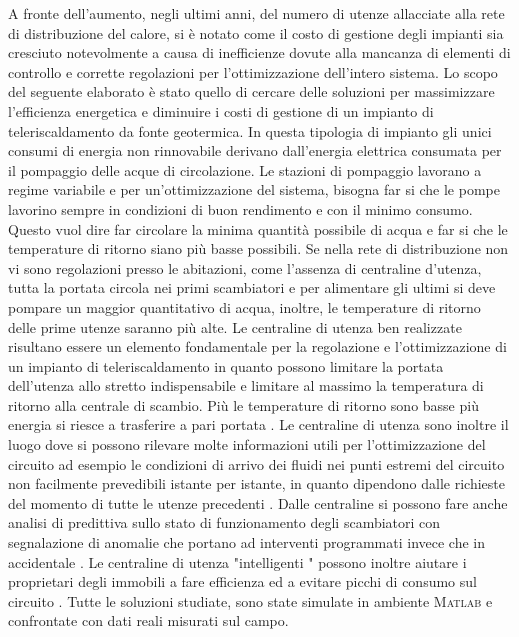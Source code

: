 \documentclass[laurea,oneside,11pt]{USiena_tesiLM}
\begin{document}
A fronte dell'aumento, negli ultimi anni, del numero di utenze allacciate alla rete di distribuzione del calore, si è notato come il costo di gestione degli impianti sia cresciuto notevolmente a causa di inefficienze dovute alla mancanza di elementi di controllo e corrette regolazioni per l'ottimizzazione dell'intero sistema.
Lo scopo del seguente elaborato è stato quello di cercare delle soluzioni per massimizzare l'efficienza energetica e diminuire i costi di gestione di un impianto di teleriscaldamento da fonte geotermica. In questa tipologia di impianto gli unici consumi di energia non rinnovabile  derivano dall'energia elettrica consumata  per il pompaggio delle acque di circolazione. 
Le stazioni di pompaggio lavorano a regime variabile e per un'ottimizzazione del sistema, bisogna far si che le pompe lavorino sempre in condizioni di buon rendimento e con il minimo consumo. Questo vuol dire far circolare la minima quantità possibile di acqua e far si che le temperature di ritorno siano più basse possibili. Se nella rete di distribuzione non vi sono regolazioni presso le abitazioni, come l'assenza di centraline d'utenza, tutta la portata circola nei primi scambiatori e per alimentare gli ultimi si deve pompare un maggior quantitativo di acqua, inoltre, le temperature di ritorno delle prime utenze saranno più alte. Le centraline di utenza ben realizzate risultano essere un elemento fondamentale per la regolazione e l'ottimizzazione di un impianto di teleriscaldamento in quanto possono  limitare la portata dell'utenza allo stretto indispensabile e limitare al massimo la temperatura di ritorno alla centrale di scambio. Più le temperature di ritorno sono basse più energia si riesce a trasferire a pari portata . Le centraline di utenza sono inoltre il luogo dove si possono rilevare molte informazioni utili per l'ottimizzazione del circuito ad esempio le condizioni di arrivo dei fluidi nei punti estremi del circuito non facilmente prevedibili istante per istante, in quanto dipendono dalle richieste del momento di tutte le utenze precedenti .
Dalle centraline si possono fare anche analisi di predittiva sullo stato di funzionamento degli scambiatori con segnalazione di anomalie che portano ad interventi programmati invece che in accidentale .
Le centraline di utenza "intelligenti " possono inoltre aiutare i proprietari degli immobili a fare efficienza ed a evitare picchi di consumo sul circuito .
Tutte le soluzioni studiate, sono state simulate in ambiente \textsc{Matlab} e confrontate con dati reali misurati sul campo.
\end{document}
